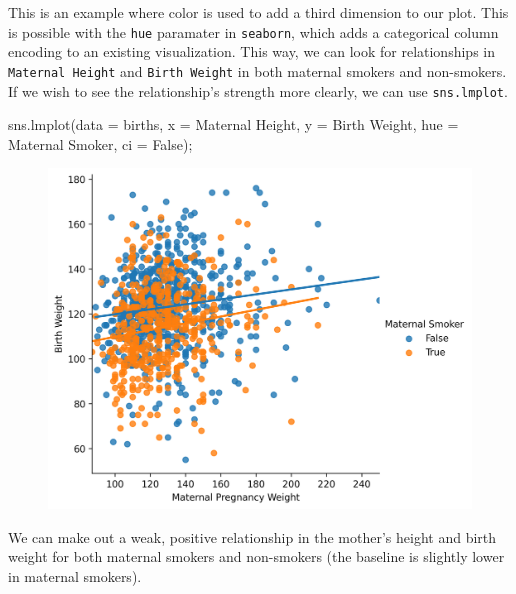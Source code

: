\documentclass[
  letterpaper,
  DIV=11,
  numbers=noendperiod]{scrreprt}
\newenvironment{Shaded}{\begin{snugshade}}{\end{snugshade}}
\newcommand{\NormalTok}[1]{\textcolor[rgb]{0.00,0.23,0.31}{#1}}
\newcommand{\OperatorTok}[1]{\textcolor[rgb]{0.37,0.37,0.37}{#1}}
\newcommand{\StringTok}[1]{\textcolor[rgb]{0.13,0.47,0.30}{#1}}
\newcommand{\VariableTok}[1]{\textcolor[rgb]{0.07,0.07,0.07}{#1}}
\begin{document}
This is an example where color is used to add a third dimension to our
plot. This is possible with the \texttt{hue} paramater in
\texttt{seaborn}, which adds a categorical column encoding to an
existing visualization. This way, we can look for relationships in
\texttt{Maternal\ Height} and \texttt{Birth\ Weight} in both maternal
smokers and non-smokers. If we wish to see the relationship's strength
more clearly, we can use \texttt{sns.lmplot}.

\begin{Shaded}
\begin{Highlighting}[]
\NormalTok{sns.lmplot(data }\OperatorTok{=}\NormalTok{ births, x }\OperatorTok{=} \StringTok{\textquotesingle{}Maternal Height\textquotesingle{}}\NormalTok{, y }\OperatorTok{=} \StringTok{\textquotesingle{}Birth Weight\textquotesingle{}}\NormalTok{, }
\NormalTok{           hue }\OperatorTok{=} \StringTok{\textquotesingle{}Maternal Smoker\textquotesingle{}}\NormalTok{, ci }\OperatorTok{=} \VariableTok{False}\NormalTok{)}\OperatorTok{;}
\end{Highlighting}
\end{Shaded}

\begin{figure}[H]

{\centering \includegraphics{visualization_2/visualization_2_files/figure-pdf/cell-9-output-1.png}

}

\end{figure}

We can make out a weak, positive relationship in the mother's height and
birth weight for both maternal smokers and non-smokers (the baseline is
slightly lower in maternal smokers).
\end{document}
